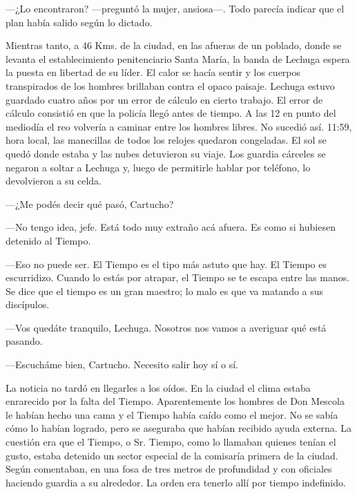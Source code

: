 \documentclass[11pt,twoside,openright,a5paper]{book}
\begin{document}
---¿Lo encontraron? ---preguntó la mujer, ansiosa---. Todo parecía indicar que el plan había salido según lo dictado.

\vspace{0.5cm}

Mientras tanto, a 46 Kms. de la ciudad, en las afueras de un poblado, donde se levanta el establecimiento penitenciario Santa María, la banda de Lechuga espera la puesta en libertad de su líder. El calor se hacía sentir y los cuerpos transpirados de los hombres brillaban contra el opaco paisaje. Lechuga estuvo guardado cuatro años por un error de cálculo en cierto trabajo. El error de cálculo consistió en que la policía llegó antes de tiempo. A las 12 en punto del mediodía el reo volvería a caminar entre los hombres libres. No sucedió así. 11:59, hora local, las manecillas de todos los relojes quedaron congeladas. El sol se quedó donde estaba y las nubes detuvieron su viaje. Los guardia cárceles se negaron a soltar a Lechuga y, luego de permitirle hablar por teléfono, lo devolvieron a su celda.

---¿Me podés decir qué pasó, Cartucho?

---No tengo idea, jefe. Está todo muy extraño acá afuera. Es como si hubiesen detenido al Tiempo.

---Eso no puede ser. El Tiempo es el tipo más astuto que hay. El Tiempo es escurridizo. Cuando lo estás por atrapar, el Tiempo se te escapa entre las manos. Se dice que el tiempo es un gran maestro; lo malo es que va matando a sus discípulos.

---Vos quedáte tranquilo, Lechuga. Nosotros nos vamos a averiguar qué está pasando.

---Escucháme bien, Cartucho. Necesito salir hoy sí o sí.

\vspace{0.5cm}

La noticia no tardó en llegarles a los oídos. En la ciudad el clima estaba enrarecido por la falta del Tiempo. Aparentemente los hombres de Don Mescola le habían hecho una cama y el Tiempo había caído como el mejor. No se sabía cómo lo habían logrado, pero se aseguraba que habían recibido ayuda externa. La cuestión era que el Tiempo, o Sr. Tiempo, como lo llamaban quienes tenían el gusto, estaba detenido un sector especial de la comisaría primera de la ciudad. Según comentaban, en una fosa de tres metros de profundidad y con oficiales haciendo guardia a su alrededor. La orden era tenerlo allí por tiempo indefinido.

\vspace{0.5cm}
\end{document}
